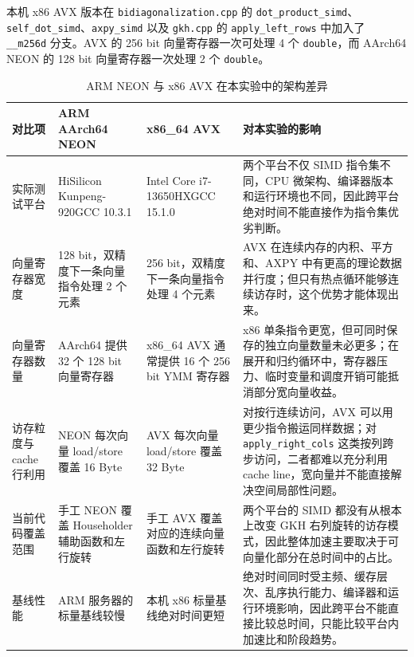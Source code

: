 \documentclass[UTF8,a4paper]{ctexart}
\renewcommand{\arraystretch}{1.08}
\begin{document}
本机 x86 AVX 版本在 \texttt{bidiagonalization.cpp} 的 \texttt{dot\_product\_simd}、\texttt{self\_dot\_simd}、\texttt{axpy\_simd} 以及 \texttt{gkh.cpp} 的 \texttt{apply\_left\_rows} 中加入了 \texttt{\_\_m256d} 分支。AVX 的 256 bit 向量寄存器一次可处理 4 个 \texttt{double}，而 AArch64 NEON 的 128 bit 向量寄存器一次处理 2 个 \texttt{double}。

\begin{table}[H]
  \centering
  \footnotesize
  \renewcommand{\arraystretch}{1.18}
  \begin{tabularx}{\textwidth}{L{2.15cm}L{3.05cm}L{3.05cm}Y}
    \toprule
    \textbf{对比项} & \textbf{ARM AArch64 NEON} & \textbf{x86\_64 AVX} & \textbf{对本实验的影响} \\
    \midrule
    实际测试平台 & HiSilicon Kunpeng-920\newline GCC 10.3.1 & Intel Core i7-13650HX\newline GCC 15.1.0 & 两个平台不仅 SIMD 指令集不同，CPU 微架构、编译器版本和运行环境也不同，因此跨平台绝对时间不能直接作为指令集优劣判断。 \\
    向量寄存器宽度 & 128 bit，双精度下一条向量指令处理 2 个元素 & 256 bit，双精度下一条向量指令处理 4 个元素 & AVX 在连续内存的内积、平方和、AXPY 中有更高的理论数据并行度；但只有热点循环能够连续访存时，这个优势才能体现出来。 \\
    向量寄存器数量 & AArch64 提供 32 个 128 bit 向量寄存器 & x86\_64 AVX 通常提供 16 个 256 bit YMM 寄存器 & x86 单条指令更宽，但可同时保存的独立向量数量未必更多；在展开和归约循环中，寄存器压力、临时变量和调度开销可能抵消部分宽向量收益。 \\
    访存粒度与 cache 行利用 & NEON 每次向量 load/store 覆盖 16 Byte & AVX 每次向量 load/store 覆盖 32 Byte & 对按行连续访问，AVX 可以用更少指令搬运同样数据；对 \texttt{apply\_right\_cols} 这类按列跨步访问，二者都难以充分利用 cache line，宽向量并不能直接解决空间局部性问题。 \\
    当前代码覆盖范围 & 手工 NEON 覆盖 Householder 辅助函数和左行旋转 & 手工 AVX 覆盖对应的连续向量函数和左行旋转 & 两个平台的 SIMD 都没有从根本上改变 GKH 右列旋转的访存模式，因此整体加速主要取决于可向量化部分在总时间中的占比。 \\
    基线性能 & ARM 服务器的标量基线较慢 & 本机 x86 标量基线绝对时间更短 & 绝对时间同时受主频、缓存层次、乱序执行能力、编译器和运行环境影响，因此跨平台不能直接比较总时间，只能比较平台内加速比和阶段趋势。 \\
    \bottomrule
  \end{tabularx}
  \renewcommand{\arraystretch}{1.08}
  \caption{ARM NEON 与 x86 AVX 在本实验中的架构差异}
  \label{tab:platform-arch}
\end{table}
\end{document}
